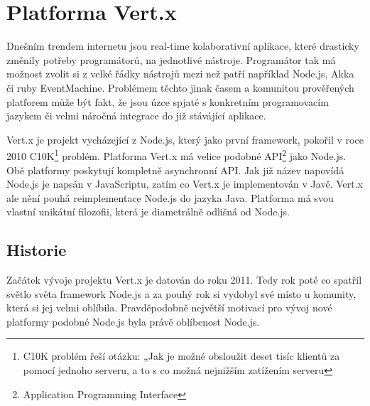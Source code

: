 
\chapter{Platforma Vert.x}

Dnešním trendem internetu jsou real-time kolaborativní aplikace, které drasticky změnily potřeby programátorů, na jednotlivé nástroje. Programátor tak má možnost zvolit si z velké řádky nástrojů mezi než patří například Node.js, Akka či ruby EventMachine. Problémem těchto jinak časem a komunitou prověřených platforem může být fakt, že jsou úzce spjaté s konkretním programovacím jazykem či velmi náročná integrace do již stávájící aplikace.

Vert.x je projekt vycházející z Node.js, který jako první framework, pokořil v roce 2010 C10K\footnote{C10K problém řeší otázku: „Jak je možné obsloužit deset tisíc klientů za pomocí jednoho serveru, a to s co možná nejnižším zatížením serveru} problém. Platforma Vert.x má velice podobné API\footnote{Application Programming Interface} jako Node.js. Obě platformy poskytují kompletně asynchronní API. Jak již název napovídá Node.js je napsán v JavaScriptu, zatím co Vert.x je implementován v Javě. Vert.x ale nění pouhá reimplementace Node.js do jazyka Java. Platforma má svou vlastní unikátní filozofii, která je diametrálně odlišná od Node.js.


\section{Historie}

Začátek vývoje projektu Vert.x je datován do roku 2011. Tedy rok poté co spatřil světlo světa framework Node.js a za pouhý rok si vydobyl své místo u komunity, která si jej velmi oblíbila. Pravděpodobně největší motivací pro vývoj nové platformy podobné Node.js byla právě oblíbenost Node.js. 

